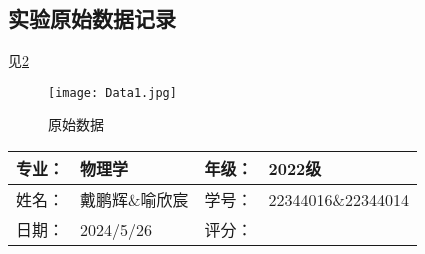 \documentclass[dvipsnames, svgnames,a4paper,11pt]{article}
\begin{document}



        \begin{figure}[htbp]
            \centering
            \quad
            \quad
    
            \label{fig:data}
        \end{figure}


\clearpage

\subsection{实验原始数据记录}

	见\cref{fig:data}

	\begin{figure}[htbp]
		\centering
		{\texttt{[image: Data1.jpg]}\label{fig:data1}}
		\quad

		\caption{原始数据}
		\label{fig:data}
	\end{figure}





	





\clearpage
\begin{table}
	\renewcommand\arraystretch{1.7}
	\begin{tabularx}{\textwidth}{|X|X|X|X|}
	\hline
	专业：& 物理学 &年级：& 2022级\\
	\hline
	姓名： & 戴鹏辉\&喻欣宸 & 学号：& 22344016\&22344014\\
	\hline
    日期：& 2024/5/26 & 评分： &\\
	\hline
	\end{tabularx}
\end{table}
\end{document}
